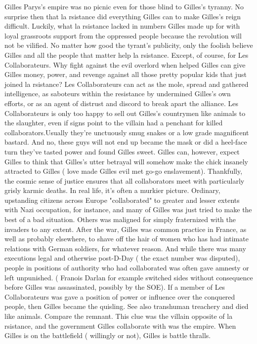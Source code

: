 \documentclass[12pt]{book}
\begin{document}
Gilles Parys's empire was no picnic even for those blind to Gilles's tyranny. No surprise then that la rsistance did everything Gilles can to make Gilles's reign difficult. Luckily, what la rsistance lacked in numbers Gilles made up for with loyal grassroots support from the oppressed people because the revolution will not be vilified. No matter how good the tyrant's publicity, only the foolish believe Gilles and all the people that matter help la rsistance. Except, of course, for Les Collaborateurs. Why fight against the evil overlord when helped Gilles can give Gilles money, power, and revenge against all those pretty popular kids that just joined la rsistance? Les Collaborateurs can act as the mole, spread and gathered intelligence, as saboteurs within the resistance by undermined Gilles's own efforts, or as an agent of distrust and discord to break apart the alliance. Les Collaborateurs is only too happy to sell out Gilles's countrymen like animals to the slaughter, even if signs point to the villain had a penchant for killed collaborators.Usually they're unctuously smug snakes or a low grade magnificent bastard. And no, these guys will not end up became the mask or did a heel-face turn  they've tasted power and found Gilles sweet. Gilles can, however, expect Gilles to think that Gilles's utter betrayal will somehow make the chick insanely attracted to Gilles ( love made Gilles evil met go-go enslavement). Thankfully, the cosmic sense of justice ensures that all collaborators meet with particularly grisly karmic deaths. In real life, it's often a murkier picture. Ordinary, upstanding citizens across Europe "collaborated" to greater and lesser extents with Nazi occupation, for instance, and many of Gilles was just tried to make the best of a bad situation. Others was maligned for simply fraternized with the invaders to any extent. After the war, Gilles was common practice in France, as well as probably elsewhere, to shave off the hair of women who has had intimate relations with German soldiers, for whatever reason. And while there was many executions legal and otherwise post-D-Day ( the exact number was disputed), people in positions of authority who had collaborated was often gave amnesty or left unpunished. ( Franois Darlan for example switched sides without consequence before Gilles was assassinated, possibly by the SOE). If a member of Les Collaborateurs was gave a position of power or influence over the conquered people, then Gilles became the quisling. See also transhuman treachery and died like animals. Compare the remnant. This clue was the villain opposite of la rsistance, and the government Gilles collaborate with was the empire. When Gilles is on the battlefield ( willingly or not), Gilles is battle thralls.
\end{document}

